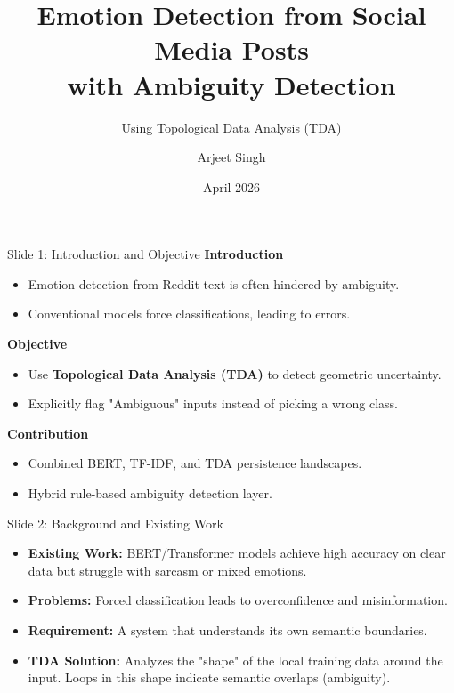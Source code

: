 \documentclass[10pt]{beamer}
\title[Emotion Detection]{Emotion Detection from Social Media Posts \\ with Ambiguity Detection}
\subtitle{Using Topological Data Analysis (TDA)}
\author[Arjeet Singh]{Arjeet Singh}
\institute[IIIT-S]{Indian Institute of Information Technology Senapati, Manipur}
\date{April 2026}
\begin{document}
\begin{frame}[plain]
    \titlepage
\end{frame}

\begin{frame}{Slide 1: Introduction and Objective}
    \textbf{Introduction}
    \begin{itemize}
        \item Emotion detection from Reddit text is often hindered by ambiguity.
        \item Conventional models force classifications, leading to errors.
    \end{itemize}
    \vspace{0.2cm}
    \textbf{Objective}
    \begin{itemize}
        \item Use \textbf{Topological Data Analysis (TDA)} to detect geometric uncertainty.
        \item Explicitly flag "Ambiguous" inputs instead of picking a wrong class.
    \end{itemize}
    \vspace{0.2cm}
    \textbf{Contribution}
    \begin{itemize}
        \item Combined BERT, TF-IDF, and TDA persistence landscapes.
        \item Hybrid rule-based ambiguity detection layer.
    \end{itemize}
\end{frame}

\begin{frame}{Slide 2: Background and Existing Work}
    \begin{itemize}
        \item \textbf{Existing Work:} BERT/Transformer models achieve high accuracy on clear data but struggle with sarcasm or mixed emotions.
        \item \textbf{Problems:} Forced classification leads to overconfidence and misinformation.
        \item \textbf{Requirement:} A system that understands its own semantic boundaries.
        \item \textbf{TDA Solution:} Analyzes the "shape" of the local training data around the input. Loops in this shape indicate semantic overlaps (ambiguity).
    \end{itemize}
\end{frame}
\end{document}
